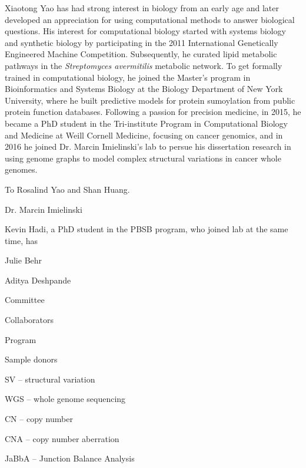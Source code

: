 \documentclass[phd,tocprelim]{cornell}
\begin{document}
\begin{biosketch}
    Xiaotong Yao has had strong interest in biology from an early age and later developed an appreciation for using computational methods to answer biological questions. His interest for computational biology started with systems biology and synthetic biology by participating in the 2011 International Genetically Engineered Machine Competition. Subsequently, he curated lipid metabolic pathways in the \textit{Streptomyces avermitilis} metabolic network. To get formally trained in computational biology, he joined the Master's program in Bioinformatics and Systems Biology at the Biology Department of New York University, where he built predictive models for protein sumoylation from public protein function databases. Following a passion for precision medicine, in 2015, he became a PhD student in the Tri-institute Program in Computational Biology and Medicine at Weill Cornell Medicine, focusing on cancer genomics, and in 2016 he joined Dr. Marcin Imielinski's lab to persue his dissertation research in using genome graphs to model complex structural variations in cancer whole genomes.
\end{biosketch}

\begin{dedication}
    To Rosalind Yao and Shan Huang.
\end{dedication}

\begin{acknowledgements}
    Dr. Marcin Imielinski

    Kevin Hadi, a PhD student in the PBSB program, who joined lab at the same time, has 

    Julie Behr
    
    Aditya Deshpande

    Committee

    Collaborators

    Program

    Sample donors

\end{acknowledgements}

\contentspage
\tablelistpage
\figurelistpage
\abbrlist

SV -- structural variation

WGS -- whole genome sequencing

CN -- copy number

CNA -- copy number aberration

JaBbA -- Junction Balance Analysis
\end{document}
